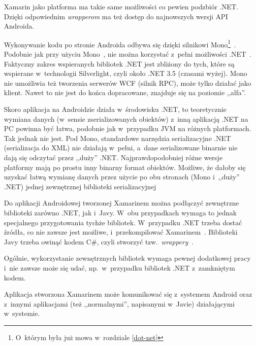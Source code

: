 \begin{description}
Xamarin jako platforma ma takie same możliwości co pewien podzbiór .NET\@. Dzięki odpowiednim \emph{wrapperom} ma też dostęp do najnowszych wersji API Androida.

Wykonywanie kodu po stronie Androida odbywa się dzięki silnikowi Mono\footnote{O~którym była już mowa w~rozdziale \ref{dot-net}}~\cite{xamarin-android-arch}.
Podobnie jak przy użyciu Mono~\cite{mono-compatibility}, nie można korzystać z~pełni możliwości .NET~\cite{xamarin-dot-net}.
Faktyczny zakres wspieranych bibliotek .NET jest zbliżony do tych, które są wspierane w~technologii Silverlight, czyli około .NET 3.5 (czasami wyżej).
Mono nie umożliwia też tworzenia serwerów WCF (silnik RPC), może tylko działać jako klient. Nawet to nie jest do końca dopracowane, znajduje się na poziomie ,,alfa''.

Skoro aplikacja na Androidzie działa w~środowisku .NET, to teoretycznie wymiana danych (w~sensie zserializowanych obiektów) z~inną aplikacją .NET na PC powinna być łatwa, podobnie jak w~przypadku JVM na różnych platformach. Tak jednak nie jest.
Pod Mono, standardowe narzędzia serializacyjne .NET (serializacja do XML) nie działają w~pełni, a~dane serializowane binarnie nie dają się odczytać przez ,,duży'' .NET\@. Najprawdopodobniej różne wersje platformy mają po prostu inny binarny format obiektów.
Możliwe, że dałoby się uzyskać łatwą wymianę danych przez użycie po obu stronach (Mono i~,,duży'' .NET) jednej zewnętrznej biblioteki serializacyjnej

Do aplikacji Androidowej tworzonej Xamarinem można podłączyć zewnętrzne biblioteki zarówno .NET, jak i~Javy.
W~obu przypadkach wymaga to jednak specjalnego przygotowania tychże bibliotek.
W~przypadku .NET trzeba dostać źródła, co nie zawsze jest możliwe, i~przekompilować Xamarinem~\cite{xamarin-dot-net}.
Biblioteki Javy trzeba owinąć kodem C\#, czyli stworzyć tzw.\ \emph{wrappery}~\cite{xamarin-binding}.

Ogólnie, wykorzystanie zewnętrznych bibliotek wymaga pewnej dodatkowej pracy i~nie zawsze może się udać, np.\ w~przypadku bibliotek .NET z~zamkniętym kodem.

Aplikacja stworzona Xamarinem może komunikować się z~systemem Android oraz z~innymi aplikacjami (też ,,normalnymi'', napisanymi w~Javie) działającymi w~systemie.



\end{description}
